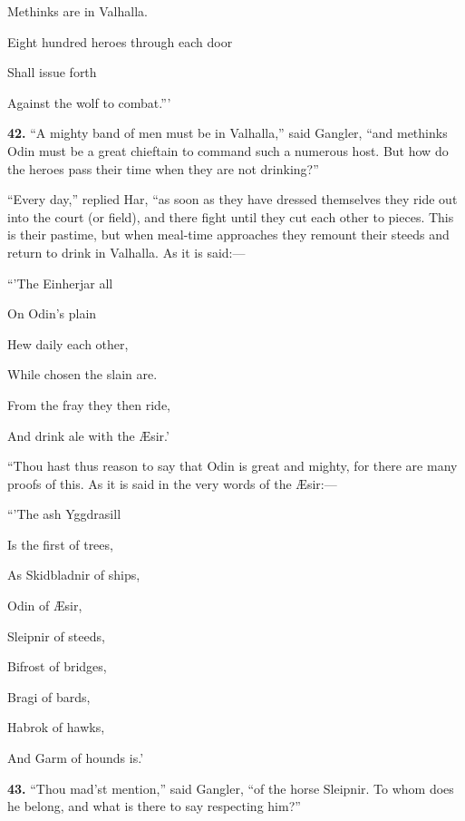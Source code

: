 Methinks are in Valhalla.

Eight hundred heroes through each door

Shall issue forth

Against the wolf to combat.'''

\textbf{42.} ``A mighty band of men must be in Valhalla,'' said Gangler, ``and
methinks Odin must be a great chieftain to command such a numerous
host. But how do the heroes pass their time when they are not
drinking?''

``Every day,'' replied Har, ``as soon as they have dressed themselves
they ride out into the court (or field), and there fight until they
cut each other to pieces. This is their pastime, but when meal-time
approaches they remount their steeds and return to drink in Valhalla.
As it is said:—

``'The Einherjar all

On Odin's plain

Hew daily each other,

While chosen the slain are.

From the fray they then ride,

And drink ale with the Æsir.'

``Thou hast thus reason to say that Odin is great and mighty, for there
are many proofs of this. As it is said in the very words of the
Æsir:—

``'The ash Yggdrasill

Is the first of trees,

As Skidbladnir of ships,

Odin of Æsir,

Sleipnir of steeds,

Bifrost of bridges,

Bragi of bards,

Habrok of hawks,

And Garm of hounds is.'


\textbf{43.} ``Thou mad'st mention,'' said Gangler, ``of the horse Sleipnir. To
whom does he belong, and what is there to say respecting him?''

